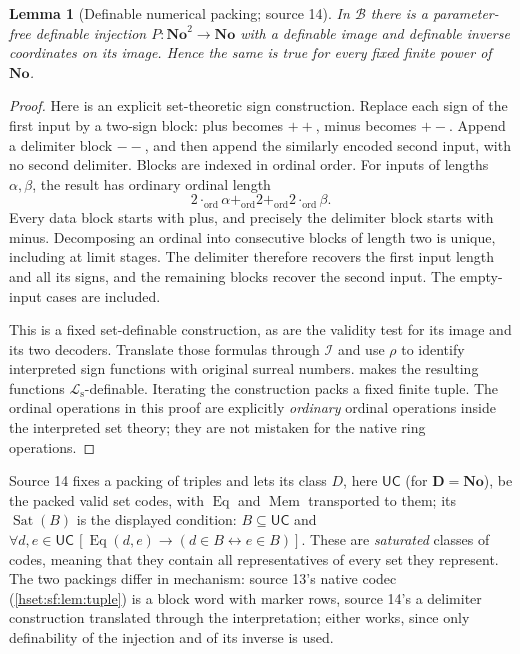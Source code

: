 \documentclass[11pt,letterpaper]{article}
\newtheorem{lemma}[lemma]{Lemma}\aliascntresetthe{lemma}
\theoremstyle{definition}
\theoremstyle{remark}
\newcommand{\No}{\mathbf{No}}
\newcommand{\B}{\mathcal B}
\newcommand{\I}{\mathcal I}
\newcommand{\Eqc}{\operatorname{Eq}}
\newcommand{\Memc}{\operatorname{Mem}}
\newcommand{\Sat}{\operatorname{Sat}}
\newcommand{\UC}{\mathsf{UC}}
\newcommand{\Dd}{\mathbf{D}}
\newcommand{\Ls}{\mathcal L_{\mathrm s}}
\begin{document}
\begin{lemma}[Definable numerical packing; source 14]\label{hset:sf:lem:pack}
In $\B$ there is a parameter-free definable injection $P:\No^2\to\No$ with a
definable image and definable inverse coordinates on its image. Hence the same is
true for every fixed finite power of $\No$.
\end{lemma}
\begin{proof}
Here is an explicit set-theoretic sign construction. Replace each sign of the first
input by a two-sign block: plus becomes $++$, minus becomes $+-$. Append a delimiter
block $--$, and then append the similarly encoded second input, with no second
delimiter. Blocks are indexed in ordinal order. For inputs of lengths
$\alpha,\beta$, the result has ordinary ordinal length
\[
 2\cdot_{\mathrm{ord}}\alpha+_{\mathrm{ord}}2+_{\mathrm{ord}}2\cdot_{\mathrm{ord}}\beta.
\]
Every data block starts with plus, and precisely the delimiter block starts with
minus. Decomposing an ordinal into consecutive blocks of length two is unique,
including at limit stages. The delimiter therefore recovers the first input length
and all its signs, and the remaining blocks recover the second input. The
empty-input cases are included.

This is a fixed set-definable construction, as are the validity test for its image
and its two decoders. Translate those formulas through $\I$ and use $\rho$ to
identify interpreted sign functions with original surreal numbers.
 makes the resulting functions $\Ls$-definable.
Iterating the construction packs a fixed finite tuple. The ordinal operations in
this proof are explicitly \emph{ordinary} ordinal operations inside the
interpreted set theory; they are not mistaken for the native ring operations.
\end{proof}

Source 14 fixes a packing of triples and lets its class $D$, here $\UC$ (for
$\Dd=\No$), be the packed valid set codes, with $\Eqc$ and $\Memc$ transported to
them; its $\Sat(B)$ is the displayed condition: $B\subseteq\UC$ and
$\forall d,e\in \UC\,[\Eqc(d,e)\to(d\in B\leftrightarrow e\in B)]$. These are
\emph{saturated} classes of codes, meaning that they contain all representatives of
every set they represent. The two packings differ in mechanism: source 13's native
codec (\cref{hset:sf:lem:tuple}) is a block word with marker rows, source 14's a
delimiter construction translated through the interpretation; either works, since
only definability of the injection and of its inverse is used.
\end{document}
